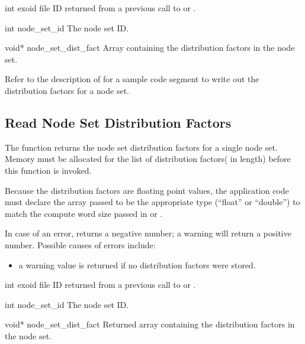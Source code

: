 
\begin{parameters}
\item[{int exoid \R{}}]
\exo{} file ID returned from a previous call to  or
.

\item[{int node_set_id \R{}}]
The node set ID.

\item[{void* node_set_dist_fact \R{}}]
Array containing the distribution factors in the node set.
\end{parameters}

Refer to the description of  for a
sample code segment to write out the distribution factors for a node
set.


\subsection{Read Node Set Distribution Factors}

The function  returns the node
set distribution factors for a single node set. Memory must be
allocated for the list of distribution factors(
in length) before this function is invoked.


Because the distribution factors are floating point values, the
application code must declare the array passed to be the appropriate
type (``float'' or ``double'') to match the compute word size passed
in  or .


In case of an error,  returns a
negative number; a warning will return a positive number. Possible
causes of errors include:

\begin{itemize}
 \item a warning value is returned if no distribution factors
were stored.
\end{itemize}


\begin{parameters}
\item[{int exoid \R{}}]
\exo{} file ID returned from a previous call to 
or .

\item[{int node_set_id \R{}}]
The node set ID.

\item[{void* node_set_dist_fact \W{}}]
Returned array containing the distribution factors in the node set.
\end{parameters}

